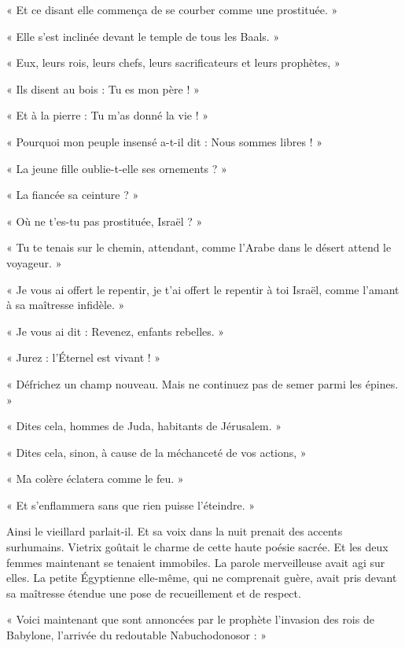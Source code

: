 \documentclass[a4paper, 11pt, oneside, polutonikogreek, french]{article}
\begin{document}
« Et ce disant elle commença de se courber comme une prostituée. »

« Elle s'est inclinée devant le temple de tous les Baals. »

« Eux, leurs rois, leurs chefs, leurs sacrificateurs et leurs prophètes, »

« Ils disent au bois : Tu es mon père ! »

« Et à la pierre : Tu m'as donné la vie ! »

« Pourquoi mon peuple insensé a-t-il dit : Nous sommes libres ! »

« La jeune fille oublie-t-elle ses ornements ? »

« La fiancée sa ceinture ? »

« Où ne t'es-tu pas prostituée, Israël ? »

« Tu te tenais sur le chemin, attendant, comme l'Arabe dans le désert attend le voyageur. »

« Je vous ai offert le repentir, je t'ai offert le repentir à toi Israël, comme l'amant à sa maîtresse infidèle. »

« Je vous ai dit : Revenez, enfants rebelles. »

« Jurez : l'Éternel est vivant ! »

« Défrichez un champ nouveau. Mais ne continuez pas de semer parmi les épines. »

« Dites cela, hommes de Juda, habitants de Jérusalem. »

« Dites cela, sinon, à cause de la méchanceté de vos actions, »

« Ma colère éclatera comme le feu. »

« Et s'enflammera sans que rien puisse l'éteindre. »

\bigskip
\centerline{\EightStarTaper}
\centerline{\EightStarTaper\EightStarTaper}
\bigskip

Ainsi le vieillard parlait-il. Et sa voix dans la nuit prenait des accents surhumains. Vietrix goûtait le charme de cette haute poésie sacrée. Et les deux femmes maintenant se tenaient immobiles. La parole merveilleuse avait agi sur elles. La petite Égyptienne elle-même, qui ne comprenait guère, avait pris devant sa maîtresse étendue une pose de recueillement et de respect.

\bigskip
\centerline{\EightStarTaper}
\centerline{\EightStarTaper\EightStarTaper}
\bigskip

« Voici maintenant que sont annoncées par le prophète l'invasion des rois de Babylone, l'arrivée du redoutable Nabuchodonosor : »
\end{document}
